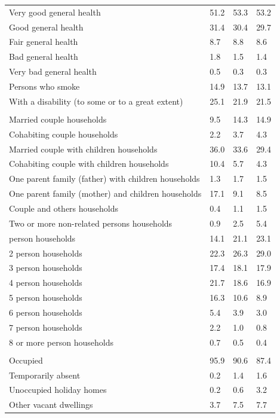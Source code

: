 \documentclass{article}
\begin{document}
\begin{table}[h]
\begin{tabular}{KTTT}
Very good general health & 51.2& 53.3& 53.2\\
Good general health & 31.4& 30.4& 29.7\\
Fair general health & 8.7& 8.8& 8.6\\
Bad general health & 1.8& 1.5& 1.4\\
Very bad general health & 0.5& 0.3& 0.3\\
    \hline
Persons who smoke & 14.9& 13.7& 13.1\\
    \hline
With a disability (to some or to a great extent) & 25.1& 21.9& 21.5\\
\hline
    \\ 
    \hline
Married couple households &  9.5& 14.3& 14.9\\
Cohabiting couple households & 2.2& 3.7& 4.3\\
Married couple with children households & 36.0& 33.6& 29.4\\
Cohabiting couple with children households & 10.4&  5.7&  4.3\\
One parent family (father) with  children households & 1.3& 1.7& 1.5\\
One parent family (mother) and children households & 17.1&  9.1&  8.5\\
Couple and others households  & 0.4& 1.1& 1.5\\
Two or more non-related persons households & 0.9& 2.5& 5.4\\
     person households & 14.1& 21.1& 23.1\\
2 person households & 22.3& 26.3& 29.0\\
3 person households & 17.4& 18.1& 17.9\\
4 person households & 21.7& 18.6& 16.9\\
5 person households & 16.3& 10.6&  8.9\\
6 person households & 5.4& 3.9& 3.0\\
7 person households & 2.2& 1.0& 0.8\\
8 or more person households & 0.7& 0.5& 0.4\\
\hline
    \\ 
    \hline
Occupied & 95.9& 90.6& 87.4\\
Temporarily absent & 0.2& 1.4& 1.6\\
Unoccupied holiday homes & 0.2& 0.6& 3.2\\
Other vacant dwellings & 3.7& 7.5& 7.7\\
\hline
\end{tabular}
\end{table}
\end{document}
